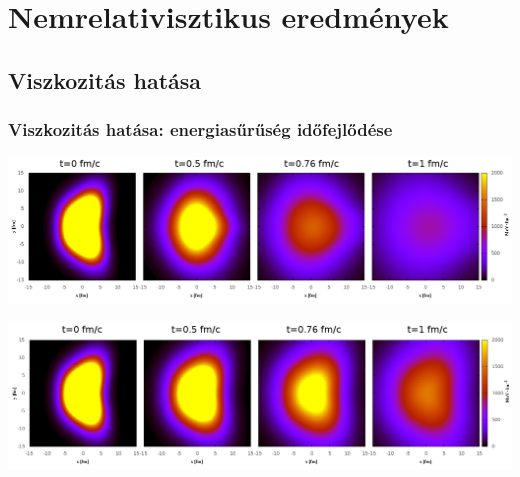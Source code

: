 \documentclass{beamer}
\begin{document}
\section{Nemrelativisztikus eredmények}

\subsection{Viszkozitás hatása}
\begin{frame}[noframenumbering]
\frametitle{Viszkozitás hatása: energiasűrűség időfejlődése}
\begin{minipage}{0.04\textwidth}
\end{minipage}
\begin{minipage}{0.95\textwidth}
\begin{center}
    \includegraphics[scale=0.19]{pic/res/nonrel/anim/ev0}

    \includegraphics[scale=0.19]{pic/res/nonrel/anim/ev10}
\end{center}
\end{minipage}
\end{frame}
\end{document}
